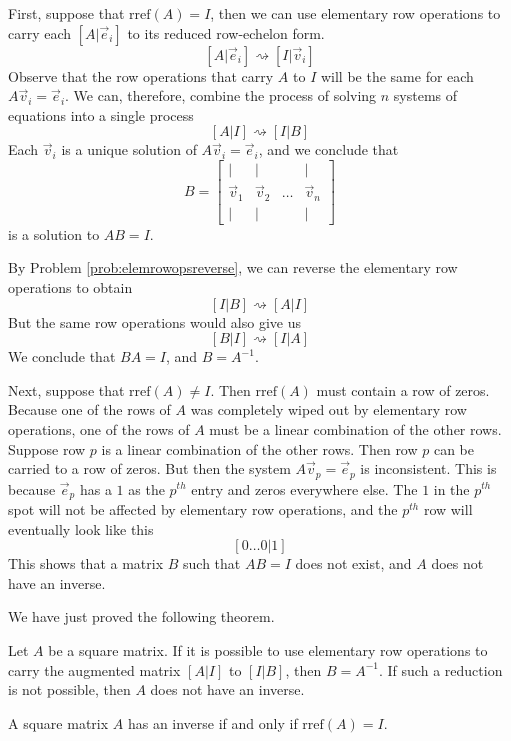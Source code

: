 \documentclass{ximera}
\begin{document}
First, suppose that $\mbox{rref}(A)=I$, then we can use elementary row operations to carry each $[A|\vec{e}_i]$ to its reduced row-echelon form.
$$[A|\vec{e}_i]\rightsquigarrow [I|\vec{v}_i]$$
Observe that the row operations that carry $A$ to $I$ will be the same for each $A\vec{v}_i=\vec{e}_i$.  We can, therefore, combine the process of solving $n$ systems of equations into a single process
$$[A|I]\rightsquigarrow [I|B]$$
Each $\vec{v}_i$ is a unique solution of $A\vec{v}_i=\vec{e}_i$, and we conclude that $$B=\begin{bmatrix}
           | & |& &|\\
		\vec{v}_1 & \vec{v}_2 &\dots &\vec{v}_n\\
		|&| & &|
         \end{bmatrix}$$ is a solution to $AB=I$.  
 
By Problem \ref{prob:elemrowopsreverse}, we can reverse the elementary row operations to obtain
$$[I|B]\rightsquigarrow [A|I]$$
But the same row operations would also give us
$$[B|I]\rightsquigarrow [I|A]$$
We conclude that $BA=I$, and $B=A^{-1}$.
         
Next, suppose that $\mbox{rref}(A)\neq I$.  Then $\mbox{rref}(A)$ must contain a row of zeros.  Because one of the rows of $A$ was completely wiped out by elementary row operations, one of the rows of $A$ must be a linear combination of the other rows.  Suppose row $p$ is a linear combination of the other rows.  Then row $p$ can be carried to a row of zeros. But then the system $A\vec{v}_p=\vec{e}_p$ is inconsistent.  This is because $\vec{e}_p$ has a $1$ as the $p^{th}$ entry and zeros everywhere else.  The $1$ in the $p^{th}$ spot will not be affected by elementary row operations, and the $p^{th}$ row will eventually look like this
$$[0\ldots 0|1]$$
This shows that a matrix $B$ such that $AB=I$ does not exist, and $A$ does not have an inverse.

We have just proved the following theorem.

\begin{theorem}\label{th:matrixinverse}
Let $A$ be a square matrix.  If it is possible to use elementary row operations to carry the augmented matrix $[A|I]$ to $[I|B]$, then $B=A^{-1}$.  If such a reduction is not possible, then $A$ does not have an inverse.
\end{theorem}

\begin{corollary}\label{cor:rrefI}
A square matrix $A$ has an inverse if and only if $\mbox{rref}(A)=I$.
\end{corollary}
\end{document}
